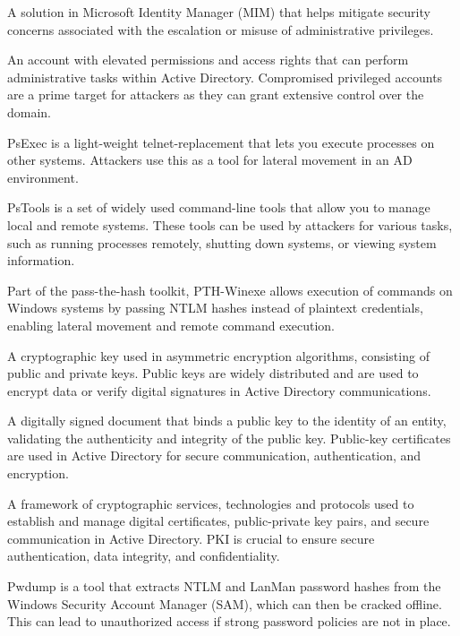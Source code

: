  A solution in Microsoft Identity Manager (MIM) that helps mitigate security concerns associated with the escalation or misuse of administrative privileges.

 An account with elevated permissions and access rights that can perform administrative tasks within Active Directory. Compromised privileged accounts are a prime target for attackers as they can grant extensive control over the domain.

 PsExec is a light-weight telnet-replacement that lets you execute processes on other systems. Attackers use this as a tool for lateral movement in an AD environment.

 PsTools is a set of widely used command-line tools that allow you to manage local and remote systems. These tools can be used by attackers for various tasks, such as running processes remotely, shutting down systems, or viewing system information.

 Part of the pass-the-hash toolkit, PTH-Winexe allows execution of commands on Windows systems by passing NTLM hashes instead of plaintext credentials, enabling lateral movement and remote command execution.

 A cryptographic key used in asymmetric encryption algorithms, consisting of public and private keys. Public keys are widely distributed and are used to encrypt data or verify digital signatures in Active Directory communications.

 A digitally signed document that binds a public key to the identity of an entity, validating the authenticity and integrity of the public key. Public-key certificates are used in Active Directory for secure communication, authentication, and encryption.

 A framework of cryptographic services, technologies and protocols used to establish and manage digital certificates, public-private key pairs, and secure communication in Active Directory. PKI is crucial to ensure secure authentication, data integrity, and confidentiality.

 Pwdump is a tool that extracts NTLM and LanMan password hashes from the Windows Security Account Manager (SAM), which can then be cracked offline. This can lead to unauthorized access if strong password policies are not in place.

